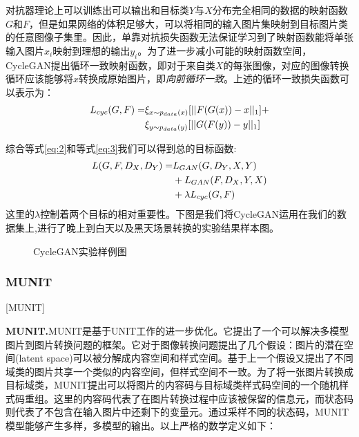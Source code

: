 对抗器理论上可以训练出可以输出和目标类$Y$与$X$分布完全相同的数据的映射函数$G$和$F$，但是如果网络的体积足够大，可以将相同的输入图片集映射到目标图片类的任意图像子集里。因此，单靠对抗损失函数无法保证学习到了映射函数能将单张输入图片$x_i$映射到理想的输出$y_i$。为了进一步减小可能的映射函数空间，CycleGAN提出循环一致映射函数，即对于来自类$X$的每张图像，对应的图像转换循环应该能够将$x$转换成原始图片，即\textit{向前循环一致}。上述的循环一致损失函数可以表示为：
\begin{align*}
    \label{eq:3}
    \centering
    L_{cyc}(G,F)= & \xi_{x\sim p_{data}(x)}[||F(G(x))-x||_1] + \\
    & \xi_{y\sim p_{data}(y)}[||G(F(y))-y||_1]
\end{align*}

综合等式\ref{eq:2}和等式\ref{eq:3}我们可以得到总的目标函数:
\begin{align*}
    \centering
    L(G, F, D_X, D_Y) = & L_{GAN}(G,D_Y, X, Y) \\
    & + L_{GAN}(F,D_X, Y, X) \\
    & + \lambda L_{cyc}(G, F)
\end{align*}
这里的$\lambda$控制着两个目标的相对重要性。下图是我们将CycleGAN运用在我们的数据集上,进行了晚上到白天以及黑天场景转换的实验结果样本图。

\begin{figure}[h]
    \centering
    \caption{CycleGAN实验样例图}
\end{figure}


\subsubsection{MUNIT}[MUNIT]

\textbf{MUNIT.}\cite{MUNIT}\quad MUNIT是基于UNIT\cite{UNIT}工作的进一步优化。它提出了一个可以解决多模型图片到图片转换问题的框架。它对于图像转换问题提出了几个假设：图片的潜在空间(latent space)可以被分解成内容空间和样式空间。基于上一个假设又提出了不同域类的图片共享一个类似的内容空间，但样式空间不一致。为了将一张图片转换成目标域类，MUNIT提出可以将图片的内容码与目标域类样式码空间的一个随机样式码重组。这里的内容码代表了在图片转换过程中应该被保留的信息元，而状态码则代表了不包含在输入图片中还剩下的变量元。通过采样不同的状态码，MUNIT模型能够产生多样，多模型的输出。以上严格的数学定义如下：

